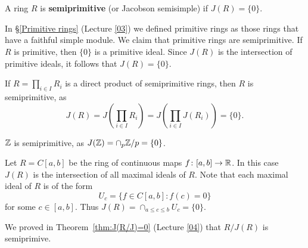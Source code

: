 \chapter{}


\begin{definition}
	A ring $R$ is \textbf{semiprimitive} (or Jacobson semisimple) if  $J(R)=\{0\}$.
\end{definition}

In \S\ref{Primitive rings} (Lecture \ref{03}) we defined primitive rings as
those rings that have a faithful simple module.  We claim that primitive rings
are semiprimitive. If $R$ is primitive, then $\{0\}$ is a primitive ideal. Since
$J(R)$ is the intersection of primitive ideals, it follows that $J(R)=\{0\}$.

\begin{example}
	If $R=\prod_{i\in I}R_i$ is a direct product of semiprimitive rings, then
	$R$ is semiprimitive, as 
	\[
		J(R)=J\left(\prod_{i\in I}R_i\right)=J\left(\prod_{i\in I}J(R_i)\right)=\{0\}.
	\]
\end{example}

\begin{example}
$\mathbb{Z}$ is semiprimitive, as $J(\mathbb{Z})=\cap_{p}\mathbb{Z}/p=\{0\}$.
\end{example}

\begin{example}
	\label{exa:C[a,b]}
	Let $R=C[a,b]$ be the ring of continuous maps $f\colon [a,b]\to\mathbb{R}$. 
	In this case $J(R)$ is the intersection of all maximal ideals of $R$. Note that 
	each maximal ideal of $R$ is of the form 
	\[
		U_c=\{f\in C[a,b]:f(c)=0\}
	\]
	for some $c\in[a,b]$. 
	Thus $J(R)=\cap_{a\leq c\leq
	b}U_c=\{0\}$.
\end{example}

We proved in Theorem~\ref{thm:J(R/J)=0} (Lecture \ref{04}) 
that $R/J(R)$ is semiprimive. 

%
%


